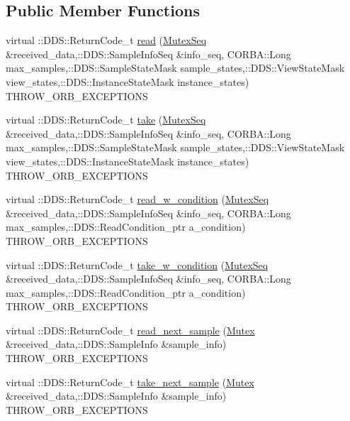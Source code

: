 \subsection*{Public Member Functions}
\begin{DoxyCompactItemize}
\item 
virtual ::DDS::ReturnCode\_\-t \hyperlink{classKnowledge_1_1MutexDataReaderView__impl_abea6a456967772cfaf9bce53b33871a8}{read} (\hyperlink{namespaceKnowledge_a3165529aa87299c6a92754fbd7eeeff4}{MutexSeq} \&received\_\-data,::DDS::SampleInfoSeq \&info\_\-seq, CORBA::Long max\_\-samples,::DDS::SampleStateMask sample\_\-states,::DDS::ViewStateMask view\_\-states,::DDS::InstanceStateMask instance\_\-states) THROW\_\-ORB\_\-EXCEPTIONS
\item 
virtual ::DDS::ReturnCode\_\-t \hyperlink{classKnowledge_1_1MutexDataReaderView__impl_a79805fa2ac26110415f372f144c5033e}{take} (\hyperlink{namespaceKnowledge_a3165529aa87299c6a92754fbd7eeeff4}{MutexSeq} \&received\_\-data,::DDS::SampleInfoSeq \&info\_\-seq, CORBA::Long max\_\-samples,::DDS::SampleStateMask sample\_\-states,::DDS::ViewStateMask view\_\-states,::DDS::InstanceStateMask instance\_\-states) THROW\_\-ORB\_\-EXCEPTIONS
\item 
virtual ::DDS::ReturnCode\_\-t \hyperlink{classKnowledge_1_1MutexDataReaderView__impl_a4311998b744f5e4c7e1183cd7c331959}{read\_\-w\_\-condition} (\hyperlink{namespaceKnowledge_a3165529aa87299c6a92754fbd7eeeff4}{MutexSeq} \&received\_\-data,::DDS::SampleInfoSeq \&info\_\-seq, CORBA::Long max\_\-samples,::DDS::ReadCondition\_\-ptr a\_\-condition) THROW\_\-ORB\_\-EXCEPTIONS
\item 
virtual ::DDS::ReturnCode\_\-t \hyperlink{classKnowledge_1_1MutexDataReaderView__impl_a51788b1c25cc2d0c1959b45c9df9dd4e}{take\_\-w\_\-condition} (\hyperlink{namespaceKnowledge_a3165529aa87299c6a92754fbd7eeeff4}{MutexSeq} \&received\_\-data,::DDS::SampleInfoSeq \&info\_\-seq, CORBA::Long max\_\-samples,::DDS::ReadCondition\_\-ptr a\_\-condition) THROW\_\-ORB\_\-EXCEPTIONS
\item 
virtual ::DDS::ReturnCode\_\-t \hyperlink{classKnowledge_1_1MutexDataReaderView__impl_af207267c526a9b6db468528ec1384e4c}{read\_\-next\_\-sample} (\hyperlink{structKnowledge_1_1Mutex}{Mutex} \&received\_\-data,::DDS::SampleInfo \&sample\_\-info) THROW\_\-ORB\_\-EXCEPTIONS
\item 
virtual ::DDS::ReturnCode\_\-t \hyperlink{classKnowledge_1_1MutexDataReaderView__impl_ab57438634262d1d3f78b8021d54965b8}{take\_\-next\_\-sample} (\hyperlink{structKnowledge_1_1Mutex}{Mutex} \&received\_\-data,::DDS::SampleInfo \&sample\_\-info) THROW\_\-ORB\_\-EXCEPTIONS

\end{DoxyCompactItemize}
